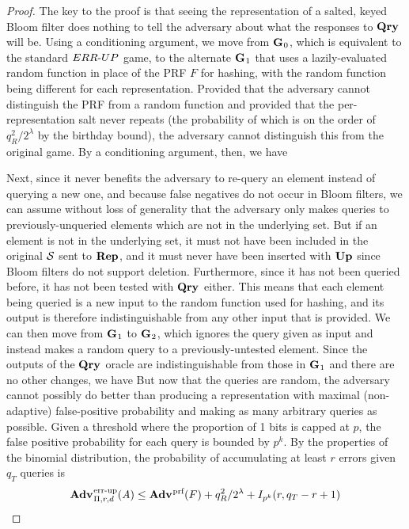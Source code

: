 \begin{proof}

The key to the proof is that seeing the representation of a salted, keyed Bloom
filter does nothing to tell the adversary about what the responses to $\textup{\textbf{Qry}}\hspace{0.5pt}$
will be. Using a conditioning argument, we move from $\textup{\textbf{G}}\hspace{0.5pt}_0$, which is
equivalent to the standard ${ERR\mbox{-}UP}$ game, to the alternate $\textup{\textbf{G}}\hspace{0.5pt}_1$ that uses a
lazily-evaluated random function in place of the PRF $F$ for hashing, with the
random function being different for each representation. Provided that the
adversary cannot distinguish the PRF from a random function and provided that
the per-representation salt never repeats (the probability of which is on the
order of $q_R^2/2^\lambda$ by the birthday bound), the adversary cannot
distinguish this from the original game. By a conditioning argument, then, we
have 
%

Next, since it never benefits the adversary to re-query an element instead of
querying a new one, and because false negatives do not occur in Bloom filters,
we can assume without loss of generality that the adversary only makes queries
to previously-unqueried elements which are not in the underlying set. But if an
element is not in the underlying set, it must not have been included in the
original $\mathcal{S}$ sent to $\textup{\textbf{Rep}}\hspace{0.5pt}$, and it must never have been inserted with
$\textup{\textbf{Up}}\hspace{0.5pt}$ since Bloom filters do not support deletion. Furthermore, since it has
not been queried before, it has not been tested with $\textup{\textbf{Qry}}\hspace{0.5pt}$ either. This means
that each element being queried is a new input to the random function used for
hashing, and its output is therefore indistinguishable from any other input that
is provided. We can then move from $\textup{\textbf{G}}\hspace{0.5pt}_1$ to $\textup{\textbf{G}}\hspace{0.5pt}_2$, which ignores the
query given as input and instead makes a random query to a previously-untested
element. Since the outputs of the $\textup{\textbf{Qry}}\hspace{0.5pt}$ oracle are indistinguishable from
those in $\textup{\textbf{G}}\hspace{0.5pt}_1$ and there are no other changes, we have
%
%
But now
that the queries are random, the adversary cannot possibly do better than
producing a representation with maximal (non-adaptive) false-positive
probability and making as many arbitrary queries as possible. Given a threshold
where the proportion of 1 bits is capped at $p$, the false positive probability
for each query is bounded by $p^k$. By the properties of the binomial
distribution, the probability of accumulating at least $r$ errors given $q_T$
queries is
$$\Adv{\errep}_{\struct,r,d}(\advA) \le \Adv{\prf}(F) + q_R^2/2^\lambda + I_{p^k}(r, q_T-r+1)$$

\end{proof}

